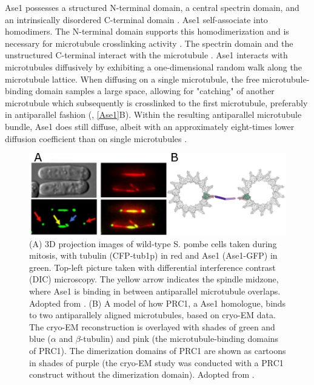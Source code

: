 Ase1 possesses a structured N-terminal domain, a central spectrin domain, and an intrinsically disordered C-terminal domain \parencite{Kapitein2008,Kellogg2018}. Ase1 self-associate into homodimers. The N-terminal domain supports this homodimerization and is necessary for microtubule crosslinking activity \parencite{Janson2007}. The spectrin domain and the unstructured C-terminal interact with the microtubule \parencite{Kellogg2018}. Ase1 interacts with microtubules diffusively by exhibiting a one-dimensional random walk along the microtubule lattice. When diffusing on a single microtubule, the free microtubule-binding domain samples a large space, allowing for "catching" of another microtubule which subsequently is crosslinked to the first microtubule, preferably in antiparallel fashion (\cite{Janson2007}, \autoref{Ase1}B). Within the resulting antiparallel microtubule bundle, Ase1 does still diffuse, albeit with an approximately eight-times lower diffusion coefficient than on single microtubules \parencite{lanskydiffusible2015}.
\begin{figure}[h!tb]
\centering
\includegraphics[scale=1.1]{Figures/Ase1.png}
\caption[Introduction to Ase1.]{
(A) 3D projection images of wild-type S. pombe cells taken during mitosis, with tubulin (CFP-tub1p) in red and Ase1 (Ase1-GFP) in green. Top-left picture taken with differential interference contrast (DIC) microscopy. The yellow arrow indicates the spindle midzone, where Ase1 is binding in between antiparallel microtubule overlaps. Adopted from \cite{Loiodice2005}. (B) A model of how PRC1, a Ase1 homologue, binds to two antiparallely aligned microtubules, based on cryo-EM data. The cryo-EM reconstruction is overlayed with shades of green and blue ($\alpha$ and $\beta$-tubulin) and pink (the microtubule-binding domains of PRC1). The dimerization domains of PRC1 are shown as cartoons in shades of purple (the cryo-EM study was conducted with a PRC1 construct without the dimerization domain). Adopted from \cite{Kellogg2016}. 
	}\label{Ase1}
\end{figure}

